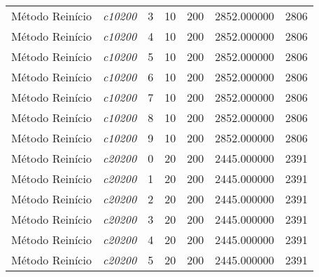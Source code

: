 {\begin{longtable}{cc|c|cc|cc}
			Método Reinício    & \textit{c10200}    & 3                               & 10               & 200              & 2852.000000                          & 2806 \\ 
			Método Reinício    & \textit{c10200}    & 4                               & 10               & 200              & 2852.000000                          & 2806 \\ 
			Método Reinício    & \textit{c10200}    & 5                               & 10               & 200              & 2852.000000                          & 2806 \\ 
			Método Reinício    & \textit{c10200}    & 6                               & 10               & 200              & 2852.000000                          & 2806 \\ 
			Método Reinício    & \textit{c10200}    & 7                               & 10               & 200              & 2852.000000                          & 2806 \\ 
			Método Reinício    & \textit{c10200}    & 8                               & 10               & 200              & 2852.000000                          & 2806 \\ 
			Método Reinício    & \textit{c10200}    & 9                               & 10               & 200              & 2852.000000                          & 2806 \\ \hline
			Método Reinício    & \textit{c20200}    & 0                               & 20               & 200              & 2445.000000                          & 2391 \\ 
			Método Reinício    & \textit{c20200}    & 1                               & 20               & 200              & 2445.000000                          & 2391 \\ 
			Método Reinício    & \textit{c20200}    & 2                               & 20               & 200              & 2445.000000                          & 2391 \\ 
			Método Reinício    & \textit{c20200}    & 3                               & 20               & 200              & 2445.000000                          & 2391 \\ 
			Método Reinício    & \textit{c20200}    & 4                               & 20               & 200              & 2445.000000                          & 2391 \\ 
			Método Reinício    & \textit{c20200}    & 5                               & 20               & 200              & 2445.000000                          & 2391 \\ 

\end{longtable}}
